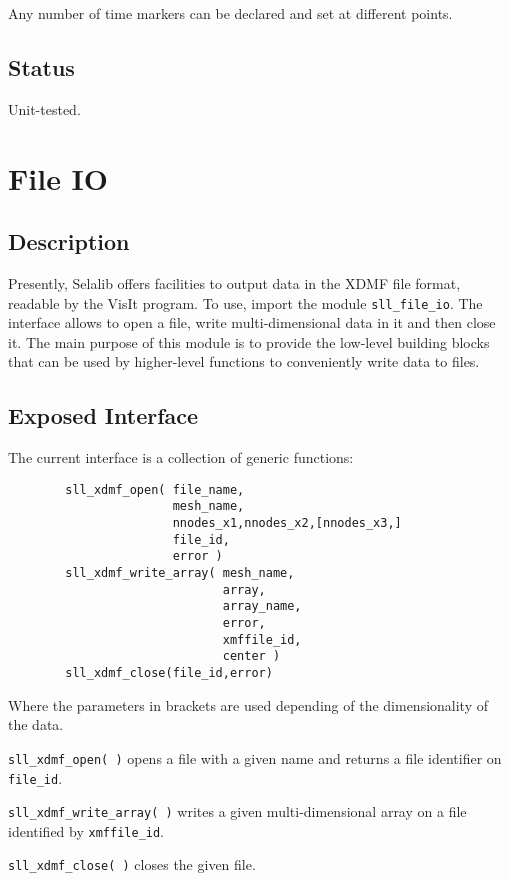 \documentclass[]{report}   %
\begin{document}
Any number of time markers can be declared and set at different points. 

\subsection{Status}
Unit-tested.

\section{File IO}

    \subsection{Description}
	Presently, Selalib offers facilities to output data in the XDMF file format, readable by the VisIt program. To use, import the module \verb+sll_file_io+. The interface allows to open a file, write multi-dimensional data in it and then close it. The main purpose of this module is to provide the low-level building blocks that can be used by higher-level functions to conveniently write data to files.

    \subsection{Exposed Interface}
    The current interface is a collection of generic functions:
    \begin{verbatim}
        sll_xdmf_open( file_name,
                       mesh_name,
                       nnodes_x1,nnodes_x2,[nnodes_x3,]
                       file_id,
                       error )
        sll_xdmf_write_array( mesh_name,
                              array,
                              array_name,
                              error,
                              xmffile_id,
                              center )
        sll_xdmf_close(file_id,error)
    \end{verbatim}
    Where the parameters in brackets are used depending of the dimensionality of the data.
    \begin{description}
       \item \verb+sll_xdmf_open( )+ opens a file with a given name and returns a file identifier on \verb+file_id+.
       \item \verb+sll_xdmf_write_array( )+ writes a given multi-dimensional array on a file identified by \verb+xmffile_id+.
       \item \verb+sll_xdmf_close( )+ closes the given file.
    \end{description}
\end{document}
